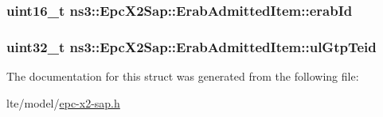 \subsubsection[{\texorpdfstring{erab\+Id}{erabId}}]{\setlength{\rightskip}{0pt plus 5cm}uint16\+\_\+t ns3\+::\+Epc\+X2\+Sap\+::\+Erab\+Admitted\+Item\+::erab\+Id}\hypertarget{structns3_1_1EpcX2Sap_1_1ErabAdmittedItem_aa97b379c6f1125823af419f91b0593f4}{}\label{structns3_1_1EpcX2Sap_1_1ErabAdmittedItem_aa97b379c6f1125823af419f91b0593f4}
\subsubsection[{\texorpdfstring{ul\+Gtp\+Teid}{ulGtpTeid}}]{\setlength{\rightskip}{0pt plus 5cm}uint32\+\_\+t ns3\+::\+Epc\+X2\+Sap\+::\+Erab\+Admitted\+Item\+::ul\+Gtp\+Teid}\hypertarget{structns3_1_1EpcX2Sap_1_1ErabAdmittedItem_a687ed49224a6fcd23acd35b970495d0e}{}\label{structns3_1_1EpcX2Sap_1_1ErabAdmittedItem_a687ed49224a6fcd23acd35b970495d0e}


The documentation for this struct was generated from the following file\+:\begin{DoxyCompactItemize}
\item 
lte/model/\hyperlink{epc-x2-sap_8h}{epc-\/x2-\/sap.\+h}\end{DoxyCompactItemize}

